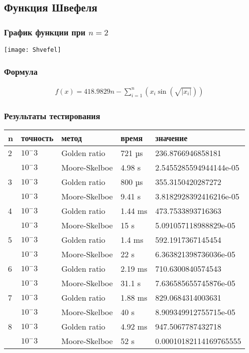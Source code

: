     \subsection*{Функция Швефеля}

    \subsubsection*{График функции при $n=2$}
    \texttt{[image: Shvefel]}

    \subsubsection*{Формула}
    \begin{gather*}
        f(x)=418.9829 n-\sum_{i=1}^n\left(x_i \sin \left(\sqrt{\left|x_i\right|}\right)\right)
    \end{gather*}

    \subsubsection*{Результаты тестирования}

    \begin{tabular}{ |p{2cm}|p{2cm}|p{3cm}|p{2cm}|p{4cm}|  }
        \hline
        n & точность & метод         & время   & значение               \\
        \hline
        2 & $10^-3$  & Golden ratio  & 721 µs  & 236.8766946858181      \\\cline{2-5}
        & $10^-3$  & Moore-Skelboe & 4.98 s  & 2.5455285594944144e-05 \\
        \hline
        3 & $10^-3$  & Golden ratio  & 800 µs  & 355.3150420287272      \\\cline{2-5}
        & $10^-3$  & Moore-Skelboe & 9.41 s  & 3.8182928392416216e-05 \\
        \hline
        4 & $10^-3$  & Golden ratio  & 1.44 ms & 473.7533893716363      \\\cline{2-5}
        & $10^-3$  & Moore-Skelboe & 15 s    & 5.091057118988829e-05  \\
        \hline
        5 & $10^-3$  & Golden ratio  & 1.4 ms  & 592.1917367145454      \\\cline{2-5}
        & $10^-3$  & Moore-Skelboe & 22 s    & 6.363821398736036e-05  \\
        \hline
        6 & $10^-3$  & Golden ratio  & 2.19 ms & 710.6300840574543      \\\cline{2-5}
        & $10^-3$  & Moore-Skelboe & 31.1 s  & 7.636585655745876e-05  \\
        \hline
        7 & $10^-3$  & Golden ratio  & 1.88 ms & 829.0684314003631      \\\cline{2-5}
        & $10^-3$  & Moore-Skelboe & 40 s    & 8.909349912755715e-05  \\
        \hline
        8 & $10^-3$  & Golden ratio  & 4.92 ms & 947.5067787432718      \\\cline{2-5}
        & $10^-3$  & Moore-Skelboe & 52 s    & 0.00010182114169765555 \\
        \hline

    \end{tabular}
